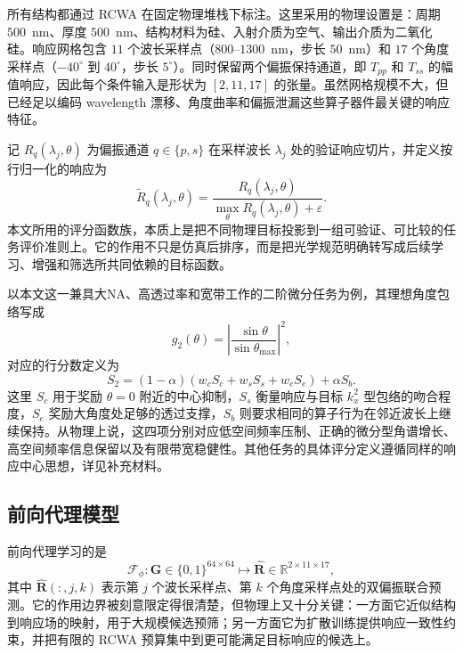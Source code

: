 所有结构都通过 RCWA 在固定物理堆栈下标注。这里采用的物理设置是：周期 $500$~nm、厚度 $500$~nm、结构材料为硅、入射介质为空气、输出介质为二氧化硅。响应网格包含 $11$ 个波长采样点（$800$--$1300$~nm，步长 $50$~nm）和 $17$ 个角度采样点（$-40^{\circ}$ 到 $40^{\circ}$，步长 $5^{\circ}$）。同时保留两个偏振保持通道，即 $T_{pp}$ 和 $T_{ss}$ 的幅值响应，因此每个条件输入是形状为 $[2,11,17]$ 的张量。虽然网格规模不大，但已经足以编码 wavelength 漂移、角度曲率和偏振泄漏这些算子器件最关键的响应特征。

记 $R_q(\lambda_j,\theta)$ 为偏振通道 $q\in\{p,s\}$ 在采样波长 $\lambda_j$ 处的验证响应切片，并定义按行归一化的响应为
\begin{equation}
\widetilde{R}_q(\lambda_j,\theta)=\frac{R_q(\lambda_j,\theta)}{\max_{\theta}R_q(\lambda_j,\theta)+\varepsilon}.
\end{equation}
本文所用的评分函数族，本质上是把不同物理目标投影到一组可验证、可比较的任务评价准则上。它的作用不只是仿真后排序，而是把光学规范明确转写成后续学习、增强和筛选所共同依赖的目标函数。

以本文这一兼具大NA、高透过率和宽带工作的二阶微分任务为例，其理想角度包络写成
\begin{equation}
g_2(\theta)=\left|\frac{\sin\theta}{\sin\theta_{\max}}\right|^{2},
\end{equation}
对应的行分数定义为
\begin{equation}
S_2=(1-\alpha)\left(w_c S_c+w_s S_s+w_e S_e\right)+\alpha S_b.
\end{equation}
这里 $S_c$ 用于奖励 $\theta=0$ 附近的中心抑制，$S_s$ 衡量响应与目标 $k_x^2$ 型包络的吻合程度，$S_e$ 奖励大角度处足够的透过支撑，$S_b$ 则要求相同的算子行为在邻近波长上继续保持。从物理上说，这四项分别对应低空间频率压制、正确的微分型角谱增长、高空间频率信息保留以及有限带宽稳健性。其他任务的具体评分定义遵循同样的响应中心思想，详见补充材料。

\subsection{前向代理模型}

前向代理学习的是
\begin{equation}
\mathcal{F}_{\phi}: \mathbf{G}\in\{0,1\}^{64\times64}\mapsto \widehat{\mathbf{R}}\in\mathbb{R}^{2\times11\times17},
\end{equation}
其中 $\widehat{\mathbf{R}}(:,j,k)$ 表示第 $j$ 个波长采样点、第 $k$ 个角度采样点处的双偏振联合预测。它的作用边界被刻意限定得很清楚，但物理上又十分关键：一方面它近似结构到响应场的映射，用于大规模候选预筛；另一方面它为扩散训练提供响应一致性约束，并把有限的 RCWA 预算集中到更可能满足目标响应的候选上。

